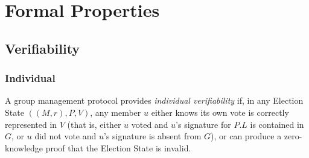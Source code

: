 \section{Formal Properties}
%
  \subsection{Verifiability}\label{Subsection:verif}
    \subsubsection{Individual}
    A group management protocol provides \emph{individual verifiability} if, in
    any Election State $((M,r), P, V)$, any member $u$
    either knows its own vote is correctly represented in $V$ (that is, either
    $u$ voted and $u$'s
    signature for $P.L$ is contained in $G$,
    or $u$ did not vote and $u$'s signature is absent from $G$), or can produce
    a zero-knowledge proof that the Election State is invalid.


